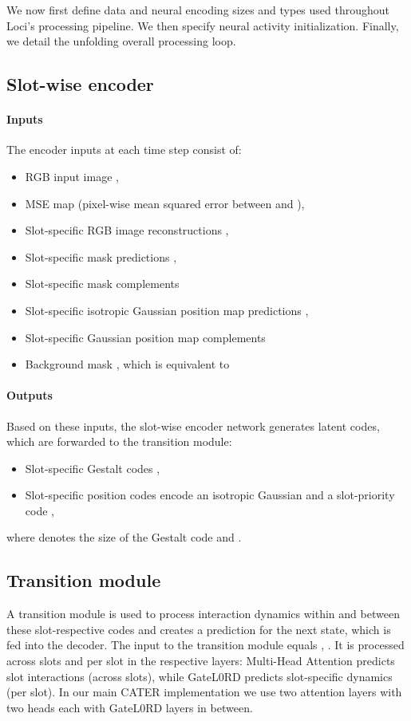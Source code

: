 \documentclass{article} \usepackage{iclr2023_conference_arxiv,times}
\begin{document}
We now first define data and neural encoding sizes and types used throughout Loci's processing pipeline. 
We then specify neural activity initialization.
Finally, we detail the unfolding overall processing loop.

\subsection{Slot-wise encoder}
\paragraph{Inputs} The encoder inputs at each time step  consist of: 
\begin{itemize}
    \item RGB input image ,
    \item MSE map  (pixel-wise mean squared error between  and ),
    \item Slot-specific RGB image reconstructions ,
    \item Slot-specific mask predictions ,
    \item Slot-specific mask complements 
    \item Slot-specific isotropic Gaussian position map predictions ,
    \item Slot-specific Gaussian position map complements 
    \item Background mask , which is equivalent to 
\end{itemize}

\paragraph{Outputs} Based on these inputs, the slot-wise encoder network generates latent codes, which are forwarded to the transition module:
\begin{itemize}    
    \item Slot-specific Gestalt codes ,
    \item Slot-specific position codes  encode an isotropic Gaussian  and a slot-priority code ,
\end{itemize}
where  denotes the size of the Gestalt code and .

\subsection{Transition module}
A transition module is used to process interaction dynamics within and between these slot-respective codes and creates a prediction for the next state, which is fed into the decoder.
The input to the transition module equals , .
It is processed across slots and per slot in the respective layers:
Multi-Head Attention predicts slot interactions (across slots), while
GateL0RD predicts slot-specific dynamics (per slot).
In our main CATER implementation we use two attention layers with two heads each with GateL0RD layers in between.
\end{document}
